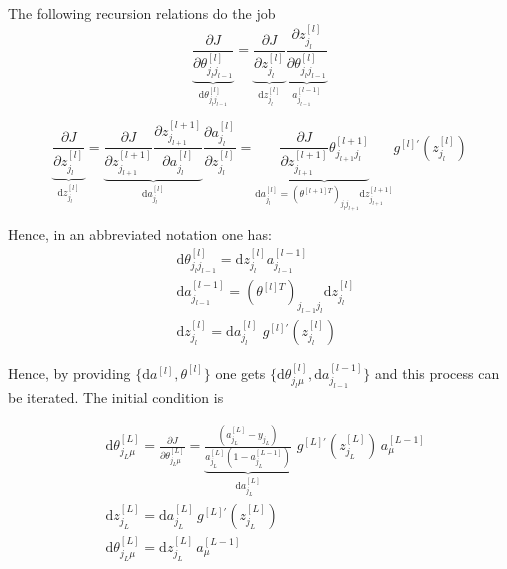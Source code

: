 \documentclass[a4paper,11pt]{article}
\newcommand{\dd}{\text{d}}
\newcommand{\na}[2]{a_{#1}^{[#2]}}
\newcommand{\nz}[2]{z_{#1}^{[#2]}}
\newcommand{\nt}[3]{\theta_{#1 #2}^{[#3]}}
\begin{document}
The following recursion relations do the job
\begin{equation}
    \underbrace{
    \frac{\partial J }{\partial  \nt{j_l}{j_{l-1}}{l}  }
    }_{\dd  \nt{j_l}{j_{l-1}}{l} } 
   =
   \underbrace{
    \frac{\partial J  }{\partial \nz{j_l}{l} }
    }_{\dd  \nz{j_{l}}{l} }
    \underbrace{
    \frac{\partial \nz{j_l}{l} }{\partial \nt{j_l}{j_{l-1}}{l}  }
    }_{ \na{j_{l-1}}{l-1} }
\end{equation}



\begin{equation}
\underbrace{
\frac{\partial J  }{\partial \nz{j_l}{l}   }
}_{\dd  \nz{j_{l}}{l} }
	=
	\underbrace{ 
	\frac{\partial J  }{\partial \nz{j_{l+1}}{l+1}   } 
	\frac{\partial \nz{j_{l+1}}{l+1}   }{ \partial \na{j_{l}}{l}  }
	}_{\dd a_{j_l}^{[l]} }
	\frac{\partial \na{j_{l}}{l}    }{ \partial \nz{j_{l}}{l}  }
	=
	\underbrace{
	\frac{\partial J  }{\partial \nz{j_{l+1}}{l+1}   } 
	 \nt{j_{l+1}}{j_l}{l+1}
	 }_{ \dd a_{j_l}^{[l]}=(\theta^{[l+1]T})_{j_l j_{l+1}} \dd z_{j_{l+1}}^{[l+1]} }
	 g^{[l]'}\left( z_{j_{l}}^{[l]}   \right)
\end{equation}

Hence, in an abbreviated notation one has:
\begin{eqnarray}
	&\dd  \nt{j_l}{j_{l-1}}{l} = \dd  \nz{j_{l}}{l}  \na{j_{l-1}}{l-1}\\
	&\dd a_{j_{l-1}}^{[l-1]}=(\theta^{[l]T})_{j_{l-1} j_{l}} \dd z_{j_{l}}^{[l]}\\
	&\dd  \nz{j_{l}}{l}= \dd a_{j_l}^{[l]} \,\, g^{[l]'}\left( z_{j_{l}}^{[l]}   \right)
\end{eqnarray}

Hence, by providing $\{ \dd a^{[l]}  , \theta^{[l]}\}$ one gets $\{ \dd  \nt{j_l}{\mu}{l}, \dd a_{j_{l-1}}^{[l-1]}\}$ and this process can be iterated. 
The initial condition is


\begin{eqnarray}
    &\dd \theta^{[L]}_{j_L \mu}= \frac{\partial J }{\partial  \nt{j_L}{\mu}{L}  } =
    \underbrace{
    \frac{(\na{j_L}{L} -y_{j_L})}{\na{j_L}{L} (1-\na{j_L}{L-1} )} 
    }_{\dd a_{j_{L}}^{[L]} }
    \,\, g^{[L]'} \left( z_{j_{L}}^{[L]} \right)
   \, \na{\mu}{L-1} \\
   & \dd z^{[L]}_{j_L }= \dd a_{j_{L}}^{[L]}\,
   g^{[L]'} \left( z_{j_{L}}^{[L]} \right)\\
   &\dd \theta^{[L]}_{j_L \mu}=  \dd \nz{j_L }{L}\, \na{\mu}{L-1} 
\end{eqnarray}
\end{document}
